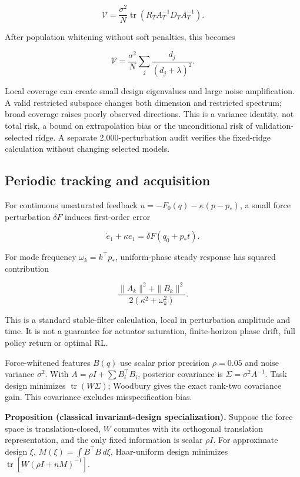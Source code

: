 \documentclass[
  10pt,
]{article}
\begin{document}
\[\mathcal V=\frac{\sigma^2}{N}\operatorname{tr}(R_TA_T^{-1}D_TA_T^{-1}).\]

After population whitening without soft penalties, this becomes

\[\mathcal V=\frac{\sigma^2}{N}\sum_j\frac{d_j}{(d_j+\lambda)^2}.\]

Local coverage can create small design eigenvalues and large noise
amplification. A valid restricted subspace changes both dimension and
restricted spectrum; broad coverage raises poorly observed directions.
This is a variance identity, not total risk, a bound on extrapolation
bias or the unconditional risk of validation-selected ridge. A separate
2,000-perturbation audit verifies the fixed-ridge calculation without
changing selected models.

\hypertarget{periodic-tracking-and-acquisition}{%
\subsection{Periodic tracking and
acquisition}\label{periodic-tracking-and-acquisition}}

For continuous unsaturated feedback \(u=-F_0(q)-\kappa(p-p_*)\), a small
force perturbation \(\delta F\) induces first-order error

\[\dot e_1+\kappa e_1=\delta F(q_0+p_*t).\]

For mode frequency \(\omega_k=k^\top p_*\), uniform-phase steady
response has squared contribution

\[\frac{\|A_k\|^2+\|B_k\|^2}{2(\kappa^2+\omega_k^2)}.\]

This is a standard stable-filter calculation, local in perturbation
amplitude and time. It is not a guarantee for actuator saturation,
finite-horizon phase drift, full policy return or optimal RL.

Force-whitened features \(B(q)\) use scalar prior precision
\(\rho=0.05\) and noise variance \(\sigma^2\). With
\(A=\rho I+\sum B_i^\top B_i\), posterior covariance is
\(\Sigma=\sigma^2A^{-1}\). Task design minimizes
\(\operatorname{tr}(W\Sigma)\); Woodbury gives the exact rank-two
covariance gain. This covariance excludes misspecification bias.

\textbf{Proposition (classical invariant-design specialization).}
Suppose the force space is translation-closed, \(W\) commutes with its
orthogonal translation representation, and the only fixed information is
scalar \(\rho I\). For approximate design \(\xi\),
\(M(\xi)=\int B^\top B\,d\xi\), Haar-uniform design minimizes
\(\operatorname{tr}[W(\rho I+nM)^{-1}]\).
\end{document}
